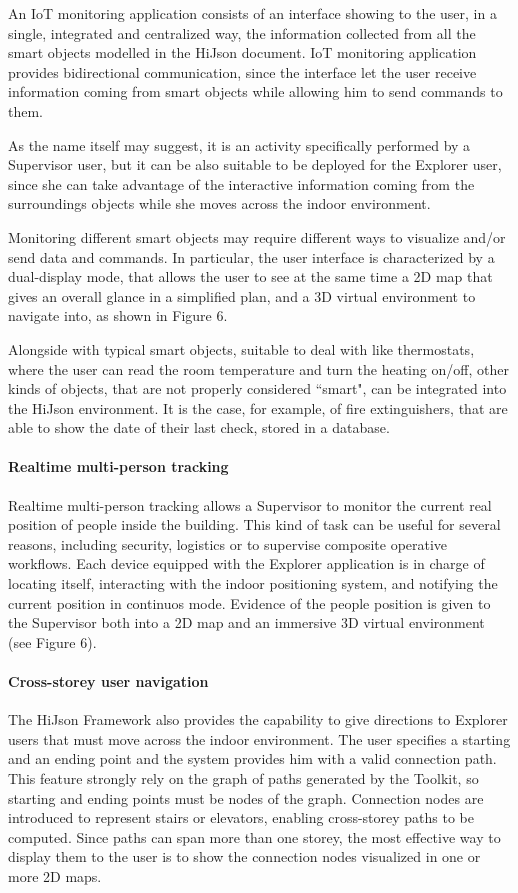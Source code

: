 \documentclass{sig-alternate}
\begin{document}
An IoT monitoring application consists of an interface showing to the user, in a single, integrated and centralized way, the information collected from all the smart objects modelled in the HiJson document. IoT monitoring application provides bidirectional communication, since the interface let the user receive information coming from smart objects while allowing him to send commands to them.

As the name itself may suggest, it is an activity specifically performed by a Supervisor user, but it can be also suitable to be deployed for the Explorer user, since she can take advantage of the interactive information coming from the surroundings objects while she moves across the indoor environment.

Monitoring different smart objects may require different ways to visualize and/or send data and commands. In particular, the user interface is characterized by a dual-display mode, that allows the user to see at the same time a 2D map that gives an overall glance in a simplified plan, and a 3D virtual environment to navigate into, as shown in Figure 6.

Alongside with typical smart objects, suitable to deal with like thermostats, where the user can read the room temperature and turn the heating on/off, other kinds of objects, that are not properly considered ``smart", can be integrated into the HiJson environment. It is the case, for example, of fire extinguishers, that are able to show the date of their last check, stored in a database.

\paragraph{Realtime multi-person tracking}
Realtime multi-person tracking allows a Supervisor to monitor the current real position of people inside the building. This kind of task can be useful for several reasons, including security, logistics or to supervise composite operative workflows. Each device equipped with the Explorer application is in charge of locating itself, interacting with the indoor positioning system, and notifying the current position in continuos mode. Evidence of the people position is given to the Supervisor both into a 2D map and an immersive 3D virtual environment (see Figure 6).

\paragraph{Cross-storey user navigation}
The HiJson Framework also provides the capability to give directions to Explorer users that must move across the indoor environment. The user specifies a starting and an ending point and the system provides him with a valid connection path. This feature strongly rely on the graph of paths generated by the Toolkit, so starting and ending points must be nodes of the graph. Connection nodes are introduced to represent stairs or elevators, enabling cross-storey paths to be computed. Since paths can span more than one storey, the most effective way to display them to the user is to show the connection nodes visualized in one or more 2D maps.
\end{document}
